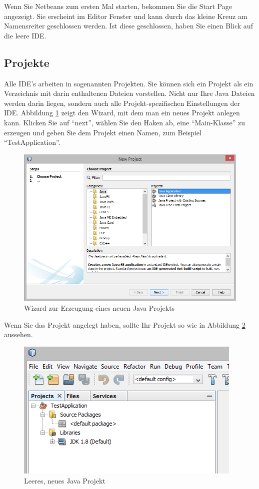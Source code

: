 Wenn Sie Netbeans zum ersten Mal starten, bekommen Sie die Start Page angezeigt. Sie erscheint im Editor Fenster und kann durch das kleine Kreuz am Namensreiter geschlossen werden. Ist diese geschlossen, haben Sie einen Blick auf die leere IDE. 

\subsection{Projekte}

Alle IDE's arbeiten in sogenannten Projekten. Sie können sich ein Projekt als ein Verzeichnis mit darin enthaltenen Dateien vorstellen. Nicht nur Ihre Java Dateien werden darin liegen, sondern auch alle Projekt-spezifischen Einstellungen der IDE. Abbildung \ref{nb:newproj} zeigt den Wizard, mit dem man ein neues Projekt anlegen kann. Klicken Sie auf "`next"', wählen Sie den Haken ab, eine "`Main-Klasse"' zu erzeugen und geben Sie dem Projekt einen Namen, zum Beispiel "`TestApplication"'.

\begin{figure}[h]
\centering
\includegraphics[width=\textwidth]{img/nb001}
\caption{Wizard zur Erzeugung eines neuen Java Projekts}
\label{nb:newproj}
\end{figure}

Wenn Sie das Projekt angelegt haben, sollte Ihr Projekt so wie in Abbildung \ref{nb:emptproj} aussehen.

\begin{figure}[h]
\centering
\includegraphics[]{img/nb002}
\caption{Leeres, neues Java Projekt}
\label{nb:emptproj}
\end{figure}

